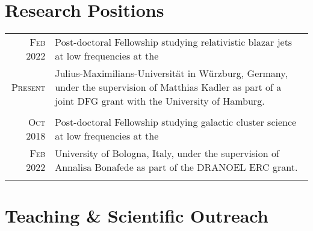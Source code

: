 \documentclass[10pt]{article} %
\begin{document}
\section{Research Positions}

\begin{tabular}{r|p{12.5cm}}
	\textsc{Feb 2022} & Post-doctoral Fellowship studying relativistic blazar jets at low frequencies at the\\
	\textsc{Present}& Julius-Maximilians-Universit{\"a}t in W{\"u}rzburg, Germany, under the supervision of Matthias Kadler as part of a joint DFG grant with the University of Hamburg.\\
	\multicolumn{2}{c}{} \\
	\textsc{Oct 2018} & Post-doctoral Fellowship studying galactic cluster science at low frequencies at the\\
	\textsc{Feb 2022}& University of Bologna, Italy, under the supervision of Annalisa Bonafede as part of the
	DRANOEL ERC grant.\\
	\multicolumn{2}{c}{} \\
\end{tabular}

\section{Teaching \& Scientific Outreach}
\end{document}
